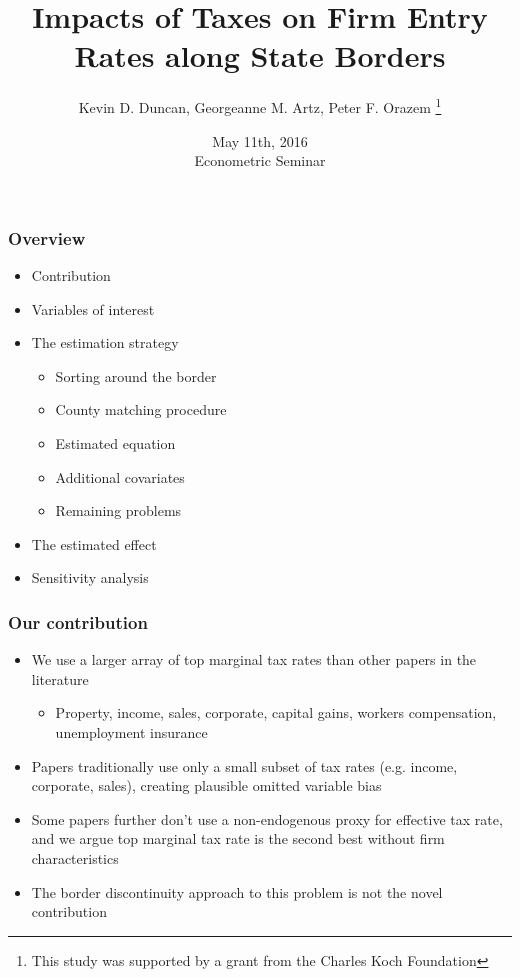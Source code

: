 \documentclass{beamer}
\begin{document}
\begin{frame}
\title{Impacts of Taxes on Firm Entry Rates along State Borders}
\author{Kevin D. Duncan, Georgeanne M. Artz, Peter F. Orazem \thanks{This study was supported by a grant from the Charles Koch Foundation}}
\date{May 11th, 2016 \\ Econometric Seminar}
\maketitle
\end{frame}

\begin{frame}
\frametitle{Overview}
\begin{itemize}
\item Contribution
\item Variables of interest
\item The estimation strategy
\begin{itemize}
\item Sorting around the border
\item County matching procedure
\item Estimated equation
\item Additional covariates
\item Remaining problems
\end{itemize}
\item The estimated effect
\item Sensitivity analysis
\end{itemize}
\end{frame}

\begin{frame}
\frametitle{Our contribution}

\begin{itemize}
\item We use a larger array of top marginal tax rates than other papers in the literature
\begin{itemize}
\item Property, income, sales, corporate, capital gains, workers compensation, unemployment insurance
\end{itemize}
\item Papers traditionally use only a small subset of tax rates (e.g. income, corporate, sales), creating plausible omitted variable bias
\item Some papers further don't use a non-endogenous proxy for effective tax rate, and we argue top marginal tax rate is the second best without firm characteristics
\item The border discontinuity approach to this problem is not the novel contribution
\end{itemize}

\end{frame}
\end{document}
